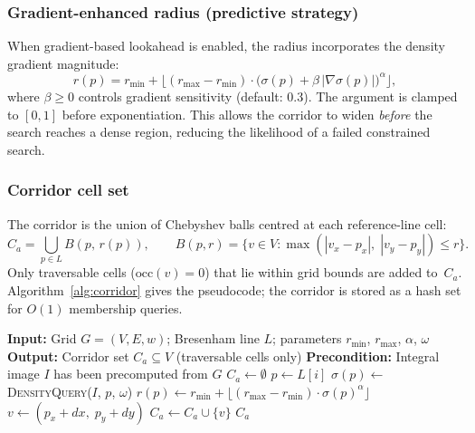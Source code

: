 \documentclass[journal]{IEEEtran}
\begin{document}
\subsubsection{Gradient-enhanced radius (predictive strategy)}
\label{sec:grad_radius}

When gradient-based lookahead is enabled, the radius incorporates the density gradient magnitude:
\begin{equation}
    r(p) = r_{\min} + \bigl\lfloor(r_{\max} - r_{\min}) \cdot \bigl(\sigma(p) + \beta\,|\nabla\sigma(p)|\bigr)^{\alpha}\bigr\rfloor,
    \label{eq:radius_grad}
\end{equation}
where $\beta \geq 0$ controls gradient sensitivity (default: 0.3).
The argument is clamped to $[0, 1]$ before exponentiation.
This allows the corridor to widen \emph{before} the search reaches a dense region, reducing the likelihood of a failed constrained search.

\subsubsection{Corridor cell set}

The corridor is the union of Chebyshev balls centred at each reference-line cell:
\begin{equation}
    C_a = \bigcup_{p \in L} B(p,\, r(p)),
    \qquad
    B(p, r) = \{v \in V : \max(|v_x - p_x|,\; |v_y - p_y|) \leq r\}.
\end{equation}
Only traversable cells ($\mathrm{occ}(v)=0$) that lie within grid bounds are added to~$C_a$.
Algorithm~\ref{alg:corridor} gives the pseudocode; the corridor is stored as a hash set for $O(1)$ membership queries.

\begin{algorithm}[h]
\caption{BuildAdaptiveCorridor}
\label{alg:corridor}
\begin{algorithmic}[1]
\STATE \textbf{Input:} Grid $G=(V,E,w)$; Bresenham line $L$; parameters $r_{\min}$, $r_{\max}$, $\alpha$, $\omega$
\STATE \textbf{Output:} Corridor set $C_a \subseteq V$ (traversable cells only)
\STATE \textbf{Precondition:} Integral image $I$ has been precomputed from $G$
\STATE
\STATE $C_a \leftarrow \emptyset$
    \STATE $p \leftarrow L[i]$
    \STATE $\sigma(p) \leftarrow$ \textsc{DensityQuery}($I$, $p$, $\omega$) 
    \STATE $r(p) \leftarrow r_{\min} + \lfloor(r_{\max} - r_{\min}) \cdot \sigma(p)^{\alpha}\rfloor$ 
            \STATE $v \leftarrow (p_x + dx,\; p_y + dy)$
                \STATE $C_a \leftarrow C_a \cup \{v\}$
            \ENDIF
        \ENDFOR
    \ENDFOR
\ENDFOR
\RETURN $C_a$
\end{algorithmic}
\end{algorithm}
\end{document}
